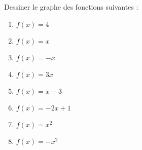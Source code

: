 
\begin{exercice}\label{exoSeconde-0060}

    Dessiner le graphe des fonctions suivantes :
    \begin{multicols}{2}
        \begin{enumerate}
            \item
                \( f(x)=4\)
            \item
                \( f(x)=x\)
            \item
                \( f(x)=-x\)
            \item
                \( f(x)=3x\)
            \item
                \( f(x)=x+3\)
            \item
                \( f(x)=-2x+1\)
            \item
                \( f(x)=x^2\)
            \item
                \( f(x)=-x^2\)
        \end{enumerate}
    \end{multicols}

\end{exercice}
